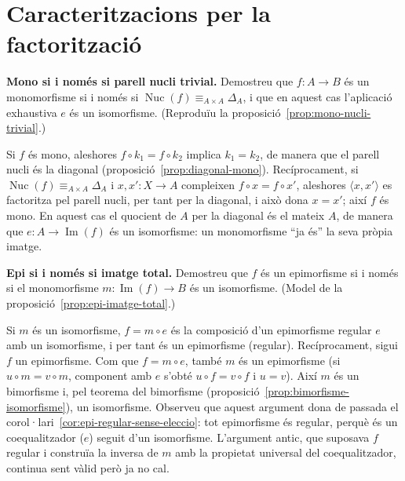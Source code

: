 \section{Caracteritzacions per la factorització}\label{prac:caracteritzacions}

\begin{exercici}
\textbf{Mono si i només si parell nucli trivial.} Demostreu que \(f\colon A\to B\) és un monomorfisme si i només si \(\operatorname{Nuc}(f)\equiv_{A\times A}\Delta_A\), i que en aquest cas l'aplicació exhaustiva \(e\) és un isomorfisme. (Reproduïu la proposició~\ref{prop:mono-nucli-trivial}.)
\end{exercici}
\begin{solucio}
Si \(f\) és mono, aleshores \(f\circ k_1=f\circ k_2\) implica \(k_1=k_2\), de manera que el parell nucli és la diagonal (proposició~\ref{prop:diagonal-mono}). Recíprocament, si \(\operatorname{Nuc}(f)\equiv_{A\times A}\Delta_A\) i \(x,x'\colon X\to A\) compleixen \(f\circ x=f\circ x'\), aleshores \(\langle x,x'\rangle\) es factoritza pel parell nucli, per tant per la diagonal, i això dona \(x=x'\); així \(f\) és mono. En aquest cas el quocient de \(A\) per la diagonal és el mateix \(A\), de manera que \(e\colon A\to\operatorname{Im}(f)\) és un isomorfisme: un monomorfisme \enquote{ja és} la seva pròpia imatge.
\end{solucio}

\begin{exercici}
\textbf{Epi si i només si imatge total.} Demostreu que \(f\) és un epimorfisme si i només si el monomorfisme \(m\colon\operatorname{Im}(f)\to B\) és un isomorfisme. (Model de la proposició~\ref{prop:epi-imatge-total}.)
\end{exercici}
\begin{solucio}
Si \(m\) és un isomorfisme, \(f=m\circ e\) és la composició d'un epimorfisme regular \(e\) amb un isomorfisme, i per tant és un epimorfisme (regular). Recíprocament, sigui \(f\) un epimorfisme. Com que \(f=m\circ e\), també \(m\) és un epimorfisme (si \(u\circ m=v\circ m\), component amb \(e\) s'obté \(u\circ f=v\circ f\) i \(u=v\)). Així \(m\) és un bimorfisme i, pel teorema del bimorfisme (proposició~\ref{prop:bimorfisme-isomorfisme}), un isomorfisme. Observeu que aquest argument dona de passada el corol·lari~\ref{cor:epi-regular-sense-eleccio}: tot epimorfisme és regular, perquè és un coequalitzador (\(e\)) seguit d'un isomorfisme. L'argument antic, que suposava \(f\) regular i construïa la inversa de \(m\) amb la propietat universal del coequalitzador, continua sent vàlid però ja no cal.
\end{solucio}

